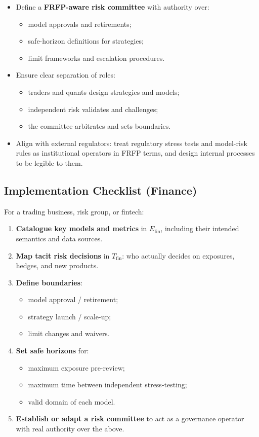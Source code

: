 \begin{itemize}
  \item Define a \textbf{FRFP-aware risk committee} with authority over:
        \begin{itemize}
          \item model approvals and retirements;
          \item safe-horizon definitions for strategies;
          \item limit frameworks and escalation procedures.
        \end{itemize}
  \item Ensure clear separation of roles:
        \begin{itemize}
          \item traders and quants design strategies and models;
          \item independent risk validates and challenges;
          \item the committee arbitrates and sets boundaries.
        \end{itemize}
  \item Align with external regulators:
        treat regulatory stress tests and model-risk rules as
        institutional operators in FRFP terms, and design internal
        processes to be legible to them.
\end{itemize}

\subsection{Implementation Checklist (Finance)}

For a trading business, risk group, or fintech:

\begin{enumerate}
  \item \textbf{Catalogue key models and metrics} in
        \(E_{\mathrm{fin}}\), including their intended semantics and
        data sources.
  \item \textbf{Map tacit risk decisions} in \(T_{\mathrm{fin}}\):
        who actually decides on exposures, hedges, and new products.
  \item \textbf{Define boundaries}:
        \begin{itemize}
          \item model approval / retirement;
          \item strategy launch / scale-up;
          \item limit changes and waivers.
        \end{itemize}
  \item \textbf{Set safe horizons} for:
        \begin{itemize}
          \item maximum exposure pre-review;
          \item maximum time between independent stress-testing;
          \item valid domain of each model.
        \end{itemize}
  \item \textbf{Establish or adapt a risk committee} to act as a
        governance operator with real authority over the above.
\end{enumerate}

